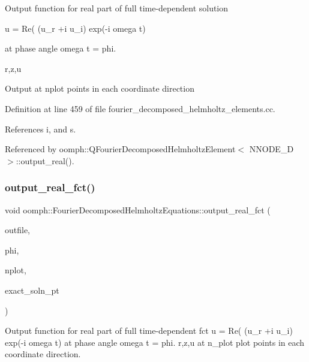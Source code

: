 Output function for real part of full time-\/dependent solution

u = Re( (u\+\_\+r +i u\+\_\+i) exp(-\/i omega t)

at phase angle omega t = phi.

r,z,u

Output at nplot points in each coordinate direction 

Definition at line 459 of file fourier\+\_\+decomposed\+\_\+helmholtz\+\_\+elements.\+cc.



References i, and s.



Referenced by oomph\+::\+Q\+Fourier\+Decomposed\+Helmholtz\+Element$<$ N\+N\+O\+D\+E\+\_\+D $>$\+::output\+\_\+real().

\mbox{\label{classoomph_1_1FourierDecomposedHelmholtzEquations_a08a9a9f9bc2fa29c994cb78533b72b34}} 
\subsubsection{\texorpdfstring{output\+\_\+real\+\_\+fct()}{output\_real\_fct()}}
{\footnotesize\ttfamily void oomph\+::\+Fourier\+Decomposed\+Helmholtz\+Equations\+::output\+\_\+real\+\_\+fct (\begin{DoxyParamCaption}\item[{std\+::ostream \&}]{outfile,  }\item[{const double \&}]{phi,  }\item[{const unsigned \&}]{nplot,  }\item[{\hyperlink{classoomph_1_1FiniteElement_a690fd33af26cc3e84f39bba6d5a85202}{Finite\+Element\+::\+Steady\+Exact\+Solution\+Fct\+Pt}}]{exact\+\_\+soln\+\_\+pt }\end{DoxyParamCaption})}



Output function for real part of full time-\/dependent fct u = Re( (u\+\_\+r +i u\+\_\+i) exp(-\/i omega t) at phase angle omega t = phi. r,z,u at n\+\_\+plot plot points in each coordinate direction. 


